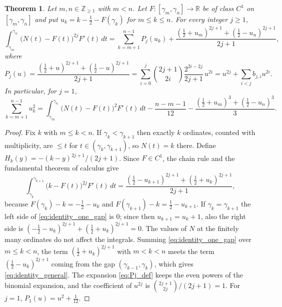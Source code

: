 \documentclass[11pt,reqno]{amsart}
\theoremstyle{plain}\newtheorem{theorem}{Theorem}[section]\newtheorem{proposition}[theorem]{Proposition}\newtheorem{lemma}[theorem]{Lemma}\newtheorem{corollary}[theorem]{Corollary}
\theoremstyle{definition}\newtheorem{hypothesis}[theorem]{Hypothesis}\newtheorem{definition}[theorem]{Definition}
\theoremstyle{remark}\newtheorem{remark}[theorem]{Remark}\newtheorem{experiment}[theorem]{Experiment}\newtheorem{question}[theorem]{Question}\newtheorem{heuristic}[theorem]{Heuristic}\newtheorem{conjecture}[theorem]{Conjecture}
\begin{document}
\begin{theorem}\label{thm:identity_general}
Let $m,n\in\mathbb Z_{\ge1}$ with $m<n$. Let $F:[\gamma_m,\gamma_n]\to\mathbb R$ be of class $C^1$ on $[\gamma_m,\gamma_n]$ and put $u_k=k-\frac12-F(\gamma_k)$ for $m\le k\le n$. For every integer $j\ge1$,
\begin{equation}
\int_{\gamma_m}^{\gamma_n}\bigl(N(t)-F(t)\bigr)^{2j}F'(t)\,dt=\sum_{k=m+1}^{n-1}P_j(u_k)+\frac{(\frac12+u_m)^{2j+1}+(\frac12-u_n)^{2j+1}}{2j+1},
\label{eq:identity_general}
\end{equation}
where
\begin{equation}
P_j(u)=\frac{(\frac12+u)^{2j+1}+(\frac12-u)^{2j+1}}{2j+1}=\sum_{i=0}^{j}\binom{2j+1}{2i}\frac{2^{2i-2j}}{2j+1}\,u^{2i}=u^{2j}+\sum_{i<j}b_{j,i}u^{2i}.
\label{eq:Pj_def}
\end{equation}
In particular, for $j=1$,
\begin{equation}
\sum_{k=m+1}^{n-1}u_k^2=\int_{\gamma_m}^{\gamma_n}\bigl(N(t)-F(t)\bigr)^2F'(t)\,dt-\frac{n-m-1}{12}-\frac{(\frac12+u_m)^3+(\frac12-u_n)^3}3 .
\label{eq:identity_quadratic}
\end{equation}
\end{theorem}

\begin{proof}
Fix $k$ with $m\le k<n$. If $\gamma_k<\gamma_{k+1}$ then exactly $k$ ordinates, counted with multiplicity, are $\le t$ for $t\in(\gamma_k,\gamma_{k+1})$, so $N(t)=k$ there. Define $H_k(y)=-(k-y)^{2j+1}/(2j+1)$.  Since $F\in C^1$, the chain rule and the fundamental theorem of calculus give
\begin{equation}
\int_{\gamma_k}^{\gamma_{k+1}}\bigl(k-F(t)\bigr)^{2j}F'(t)\,dt=\frac{(\frac12-u_{k+1})^{2j+1}+(\frac12+u_k)^{2j+1}}{2j+1},
\label{eq:identity_one_gap}
\end{equation}
because $F(\gamma_k)-k=-\frac12-u_k$ and $F(\gamma_{k+1})-k=\frac12-u_{k+1}$. If $\gamma_k=\gamma_{k+1}$ the left side of \eqref{eq:identity_one_gap} is $0$; since then $u_{k+1}=u_k+1$, also the right side is $(-\frac12-u_k)^{2j+1}+(\frac12+u_k)^{2j+1}=0$. The values of $N$ at the finitely many ordinates do not affect the integrals. Summing \eqref{eq:identity_one_gap} over $m\le k<n$, the term $(\frac12+u_k)^{2j+1}$ with $m<k<n$ meets the term $(\frac12-u_k)^{2j+1}$ coming from the gap $(\gamma_{k-1},\gamma_k)$, which gives \eqref{eq:identity_general}. The expansion \eqref{eq:Pj_def} keeps the even powers of the binomial expansion, and the coefficient of $u^{2j}$ is $\binom{2j+1}{2j}/(2j+1)=1$. For $j=1$, $P_1(u)=u^2+\frac1{12}$.
\end{proof}
\end{document}

